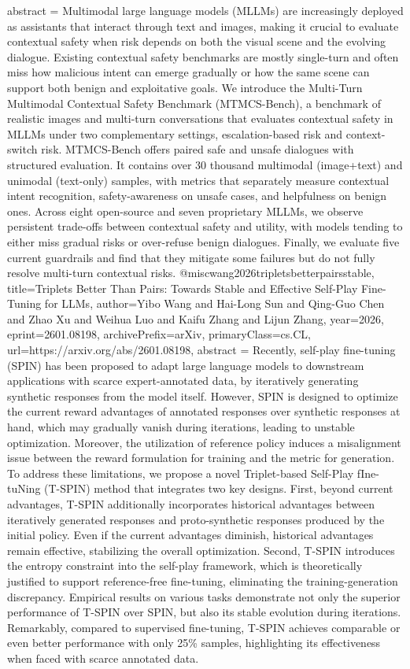 {      abstract = {Multimodal large language models (MLLMs) are increasingly deployed as assistants that interact through text and images, making it crucial to evaluate contextual safety when risk depends on both the visual scene and the evolving dialogue. Existing contextual safety benchmarks are mostly single-turn and often miss how malicious intent can emerge gradually or how the same scene can support both benign and exploitative goals. We introduce the Multi-Turn Multimodal Contextual Safety Benchmark (MTMCS-Bench), a benchmark of realistic images and multi-turn conversations that evaluates contextual safety in MLLMs under two complementary settings, escalation-based risk and context-switch risk. MTMCS-Bench offers paired safe and unsafe dialogues with structured evaluation. It contains over 30 thousand multimodal (image+text) and unimodal (text-only) samples, with metrics that separately measure contextual intent recognition, safety-awareness on unsafe cases, and helpfulness on benign ones. Across eight open-source and seven proprietary MLLMs, we observe persistent trade-offs between contextual safety and utility, with models tending to either miss gradual risks or over-refuse benign dialogues. Finally, we evaluate five current guardrails and find that they mitigate some failures but do not fully resolve multi-turn contextual risks.}
}@misc{wang2026tripletsbetterpairsstable,
      title={Triplets Better Than Pairs: Towards Stable and Effective Self-Play Fine-Tuning for LLMs}, 
      author={Yibo Wang and Hai-Long Sun and Qing-Guo Chen and Zhao Xu and Weihua Luo and Kaifu Zhang and Lijun Zhang},
      year={2026},
      eprint={2601.08198},
      archivePrefix={arXiv},
      primaryClass={cs.CL},
      url={https://arxiv.org/abs/2601.08198},
      abstract = {Recently, self-play fine-tuning (SPIN) has been proposed to adapt large language models to downstream applications with scarce expert-annotated data, by iteratively generating synthetic responses from the model itself. However, SPIN is designed to optimize the current reward advantages of annotated responses over synthetic responses at hand, which may gradually vanish during iterations, leading to unstable optimization. Moreover, the utilization of reference policy induces a misalignment issue between the reward formulation for training and the metric for generation. To address these limitations, we propose a novel Triplet-based Self-Play fIne-tuNing (T-SPIN) method that integrates two key designs. First, beyond current advantages, T-SPIN additionally incorporates historical advantages between iteratively generated responses and proto-synthetic responses produced by the initial policy. Even if the current advantages diminish, historical advantages remain effective, stabilizing the overall optimization. Second, T-SPIN introduces the entropy constraint into the self-play framework, which is theoretically justified to support reference-free fine-tuning, eliminating the training-generation discrepancy. Empirical results on various tasks demonstrate not only the superior performance of T-SPIN over SPIN, but also its stable evolution during iterations. Remarkably, compared to supervised fine-tuning, T-SPIN achieves comparable or even better performance with only 25\% samples, highlighting its effectiveness when faced with scarce annotated data.}
}
